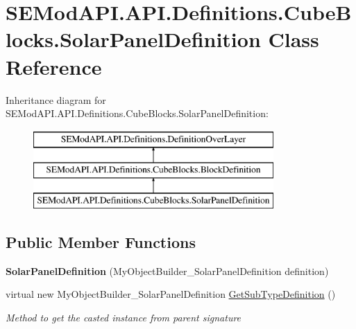 \hypertarget{class_s_e_mod_a_p_i_1_1_a_p_i_1_1_definitions_1_1_cube_blocks_1_1_solar_panel_definition}{}\section{S\+E\+Mod\+A\+P\+I.\+A\+P\+I.\+Definitions.\+Cube\+Blocks.\+Solar\+Panel\+Definition Class Reference}
\label{class_s_e_mod_a_p_i_1_1_a_p_i_1_1_definitions_1_1_cube_blocks_1_1_solar_panel_definition}
Inheritance diagram for S\+E\+Mod\+A\+P\+I.\+A\+P\+I.\+Definitions.\+Cube\+Blocks.\+Solar\+Panel\+Definition\+:\begin{figure}[H]
\begin{center}
\leavevmode
\includegraphics[height=3.000000cm]{class_s_e_mod_a_p_i_1_1_a_p_i_1_1_definitions_1_1_cube_blocks_1_1_solar_panel_definition}
\end{center}
\end{figure}
\subsection*{Public Member Functions}
\begin{DoxyCompactItemize}
\item 
\hypertarget{class_s_e_mod_a_p_i_1_1_a_p_i_1_1_definitions_1_1_cube_blocks_1_1_solar_panel_definition_a861f68f633cbf9811d5be2a573af1649}{}{\bfseries Solar\+Panel\+Definition} (My\+Object\+Builder\+\_\+\+Solar\+Panel\+Definition definition)\label{class_s_e_mod_a_p_i_1_1_a_p_i_1_1_definitions_1_1_cube_blocks_1_1_solar_panel_definition_a861f68f633cbf9811d5be2a573af1649}

\item 
virtual new My\+Object\+Builder\+\_\+\+Solar\+Panel\+Definition \hyperlink{class_s_e_mod_a_p_i_1_1_a_p_i_1_1_definitions_1_1_cube_blocks_1_1_solar_panel_definition_acacfdfdad8977f8e63396428fb070e2e}{Get\+Sub\+Type\+Definition} ()
\begin{DoxyCompactList}\small\item\em Method to get the casted instance from parent signature \end{DoxyCompactList}\end{DoxyCompactItemize}

